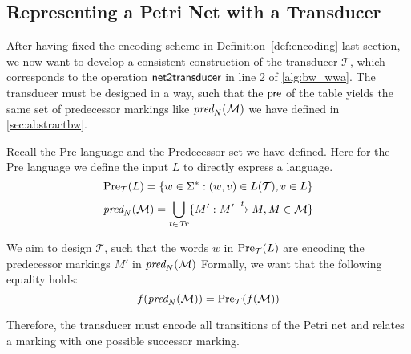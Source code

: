 \subsection{Representing a Petri Net with a Transducer}
After having fixed the encoding scheme in Definition~\autoref{def:encoding} last section, we now want to develop a consistent construction  of the transducer $\mathcal{T}$, which corresponds to the operation $\operatorname{\textsf{net2transducer}}$ in line 2 of \autoref{alg:bw_wwa}. 
The transducer must be designed in a way, such that the $\operatorname{\textsf{pre}}$ of the table yields the same set of predecessor markings like $\operatorname{\textit{pred}}_{N}(\mathcal{M})$  we have defined in \autoref{sec:abstractbw}.

\par

Recall the Pre language and the Predecessor set we have defined. Here for the Pre language we define the input $L$ to directly express a language.
\begin{equation*}
\operatorname{\text{Pre}}_{\mathcal{T}}(L) = \{ w \in \Sigma^{*}: (w,v) \in L(\mathcal{T}), v \in L \} 
\end{equation*}
\begin{equation*}
\operatorname{\textit{pred}}_{N}(\mathcal{M}) = \bigcup_{t \in \mathit{Tr}} \{M': M' \xrightarrow{t} M, M \in \mathcal{M} \}
\end{equation*}

We aim to design $\mathcal{T}$, such that the words $w$ in $\operatorname{\text{Pre}}_{\mathcal{T}}(L)$ are encoding the predecessor markings $M'$ in $\operatorname{\textit{pred}}_{N}(\mathcal{M})$
Formally, we want that the following equality holds:
\begin{equation*}
f(\operatorname{\textit{pred}}_{N}(\mathcal{M})) = \operatorname{\text{Pre}}_{\mathcal{T}}(f(\mathcal{M}))
\end{equation*}




Therefore, the transducer must encode all transitions of the Petri net and relates a marking with one possible successor marking.



